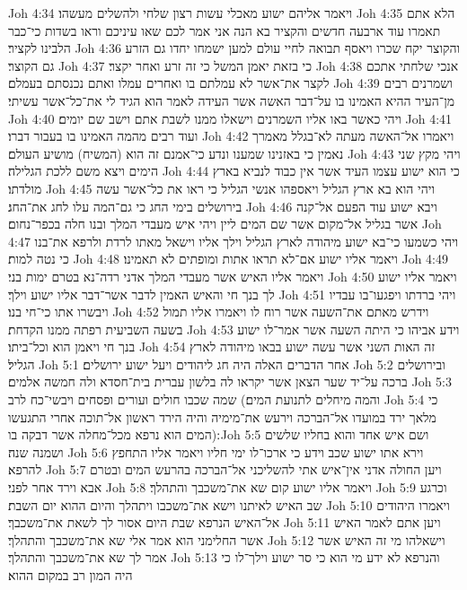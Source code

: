 Joh 4:34  ויאמר אליהם ישוע מאכלי עשות רצון שלחי ולהשלים מעשהו׃
Joh 4:35  הלא אתם תאמרו עוד ארבעה חדשים והקציר בא הנה אני אמר לכם שאו עיניכם וראו בשדות כי־כבר הלבינו לקציר׃
Joh 4:36  והקוצר יקח שכרו ויאסף תבואה לחיי עולם למען ישמחו יחדו גם הזרע גם הקוצר׃
Joh 4:37  כי בזאת יאמן המשל כי זה זרע ואחר יקצר׃
Joh 4:38  אנכי שלחתי אתכם לקצר את־אשר לא עמלתם בו ואחרים עמלו ואתם נכנסתם בעמלם׃
Joh 4:39  ושמרנים רבים מן־העיר ההיא האמינו בו על־דבר האשה אשר העידה לאמר הוא הגיד לי את־כל־אשר עשיתי׃
Joh 4:40  ויהי כאשר באו אליו השמרנים וישאלו ממנו לשבת אתם וישב שם יומים׃
Joh 4:41  ועוד רבים מהמה האמינו בו בעבור דברו׃
Joh 4:42  ויאמרו אל־האשה מעתה לא־בגלל מאמרך נאמין כי באזנינו שמענו ונדע כי־אמנם זה הוא (המשיח) מושיע העולם׃
Joh 4:43  ויהי מקץ שני הימים ויצא משם ללכת הגלילה׃
Joh 4:44  כי הוא ישוע עצמו העיד אשר אין כבוד לנביא בארץ מולדתו׃
Joh 4:45  ויהי הוא בא ארץ הגליל ויאספהו אנשי הגליל כי ראו את כל־אשר עשה בירושלים בימי החג כי גם־המה עלו לחג את־החג׃
Joh 4:46  ויבא ישוע עוד הפעם אל־קנה אשר בגליל אל־מקום אשר שם המים ליין ויהי איש מעבדי המלך ובנו חלה בכפר־נחום׃
Joh 4:47  ויהי כשמעו כי־בא ישוע מיהודה לארץ הגליל וילך אליו וישאל מאתו לרדת ולרפא את־בנו כי נטה למות׃
Joh 4:48  ויאמר אליו ישוע אם־לא תראו אתות ומופתים לא תאמינו׃
Joh 4:49  ויאמר אליו האיש אשר מעבדי המלך אדני רדה־נא בטרם ימות בני׃
Joh 4:50  ויאמר אליו ישוע לך בנך חי והאיש האמין לדבר אשר־דבר אליו ישוע וילך׃
Joh 4:51  ויהי ברדתו ויפגעו־בו עבדיו ויבשרו אתו כי־חי בנו׃
Joh 4:52  וידרש מאתם את־השעה אשר רוח לו ויאמרו אליו תמול בשעה השביעית רפתה ממנו הקדחת׃
Joh 4:53  וידע אביהו כי היתה השעה אשר אמר־לו ישוע בנך חי ויאמן הוא וכל־ביתו׃
Joh 4:54  זה האות השני אשר עשה ישוע בבאו מיהודה לארץ הגליל׃
Joh 5:1  אחר הדברים האלה היה חג ליהודים ויעל ישוע ירושלים׃
Joh 5:2  ובירושלים ברכה על־יד שער הצאן אשר יקראו לה בלשון עברית בית־חסדא ולה חמשה אלמים׃
Joh 5:3  שמה שכבו חולים ועורים ופסחים ויבשי־כח לרב (והמה מיחלים לתנועת המים׃
Joh 5:4  כי מלאך ירד במועדו אל־הברכה וירעש את־מימיה והיה הירד ראשון אל־תוכה אחרי התגעשו המים הוא נרפא מכל־מחלה אשר דבקה בו)׃
Joh 5:5  ושם איש אחד והוא בחליו שלשים ושמנה שנה׃
Joh 5:6  וירא אתו ישוע שכב וידע כי ארכו־לו ימי חליו ויאמר אליו התחפץ להרפא׃
Joh 5:7  ויען החולה אדני אין־איש אתי להשליכני אל־הברכה בהרעש המים ובטרם אבא וירד אחר לפני׃
Joh 5:8  ויאמר אליו ישוע קום שא את־משכבך והתהלך׃
Joh 5:9  וכרגע שב האיש לאיתנו וישא את־משכבו ויתהלך והיום ההוא יום השבת׃
Joh 5:10  ויאמרו היהודים אל־האיש הנרפא שבת היום אסור לך לשאת את־משכבך׃
Joh 5:11  ויען אתם לאמר האיש אשר החלימני הוא אמר אלי שא את־משכבך והתהלך׃
Joh 5:12  וישאלהו מי זה האיש אשר אמר לך שא את־משכבך והתהלך׃
Joh 5:13  והנרפא לא ידע מי הוא כי סר ישוע וילך־לו כי היה המון רב במקום ההוא׃
